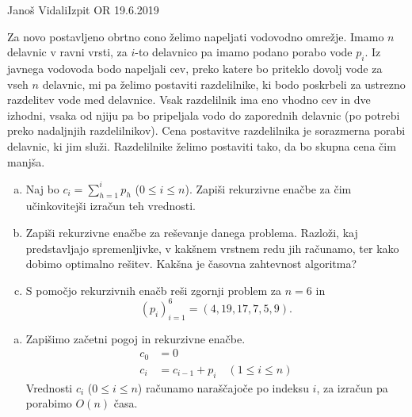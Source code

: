 \begin{naloga}{Janoš Vidali}{Izpit OR 19.6.2019}
\begin{vprasanje}
Za novo postavljeno obrtno cono želimo napeljati vodovodno omrežje.
Imamo $n$ delavnic v ravni vrsti,
za $i$-to delavnico pa imamo podano porabo vode $p_i$.
Iz javnega vodovoda bodo napeljali cev,
preko katere bo priteklo dovolj vode za vseh $n$ delavnic,
mi pa želimo postaviti razdelilnike,
ki bodo poskrbeli za ustrezno razdelitev vode med delavnice.
Vsak razdelilnik ima eno vhodno cev in dve izhodni,
vsaka od njiju pa bo pripeljala vodo do zaporednih delavnic
(po potrebi preko nadaljnjih razdelilnikov).
Cena postavitve razdelilnika je sorazmerna porabi delavnic, ki jim služi.
Razdelilnike želimo postaviti tako, da bo skupna cena čim manjša.

\begin{enumerate}[(a)]
\item Naj bo $c_i = \sum_{h=1}^i p_h$ ($0 \le i \le n$).
Zapiši rekurzivne enačbe za čim učinkovitejši izračun teh vrednosti.

\item Zapiši rekurzivne enačbe za reševanje danega problema.
Razloži, kaj pred\-stav\-lja\-jo spremenljivke,
v kakšnem vrstnem redu jih računamo, ter kako dobimo optimalno rešitev.
Kakšna je časovna zahtevnost algoritma?

\item S pomočjo rekurzivnih enačb reši zgornji problem za $n = 6$ in
$$
(p_i)_{i=1}^6 = (4, 19, 17, 7, 5, 9).
$$
\end{enumerate}
\end{vprasanje}

\begin{odgovor}
\begin{enumerate}[(a)]
\item Zapišimo začetni pogoj in rekurzivne enačbe.
\begin{align*}
c_0 &= 0 \\
c_i &= c_{i-1} + p_i \quad (1 \le i \le n)
\end{align*}
Vrednosti $c_i$ ($0 \le i \le n$) računamo naraščajoče po indeksu $i$,
za izračun pa porabimo $O(n)$ časa.


\end{enumerate}
\end{odgovor}
\end{naloga}
